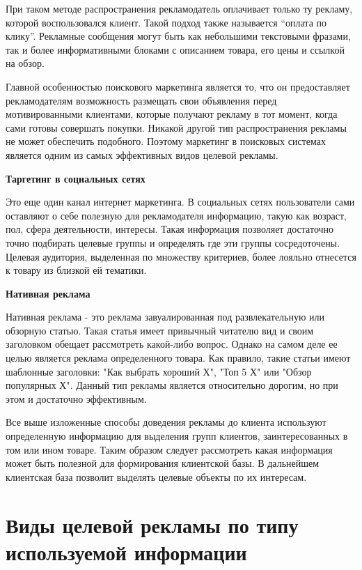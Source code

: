 При таком методе распространения рекламодатель оплачивает только ту рекламу, которой воспользовался клиент. Такой подход также называется “оплата по клику”. Рекламные сообщения могут быть как небольшими текстовыми фразами, так и более информативными блоками с описанием товара, его цены и ссылкой на обзор.

Главной особенностью поискового маркетинга является то, что он предоставляет рекламодателям возможность размещать свои объявления перед мотивированными клиентами, которые получают рекламу в тот момент, когда сами готовы совершать покупки. Никакой другой тип распространения рекламы не может обеспечить подобного. Поэтому маркетинг в поисковых системах является одним из самых эффективных видов целевой рекламы.

\textbf{Таргетинг в социальных сетях}

Это еще один канал интернет маркетинга. В социальных сетях пользователи сами оставляют о себе полезную для рекламодателя информацию, такую как возраст, пол, сфера деятельности, интересы. Такая информация позволяет достаточно точно подбирать целевые группы и определять где эти группы сосредоточены. Целевая аудитория, выделенная по множеству критериев, более лояльно отнесется к товару из близкой ей тематики.
    
\textbf{Нативная реклама}

Нативная реклама - это реклама завуалированная под развлекательную или обзорную статью. Такая статья имеет привычный читателю вид и своим заголовком обещает рассмотреть какой-либо вопрос. Однако на самом деле ее целью является реклама определенного товара. Как правило, такие статьи имеют шаблонные заголовки: "Как выбрать хороший Х", "Топ 5 Х" или "Обзор популярных Х". Данный тип рекламы является относительно дорогим, но при этом и достаточно эффективным.   

Все выше изложенные способы доведения рекламы до клиента используют определенную информацию для выделения групп клиентов, заинтересованных в том или ином товаре. Таким образом следует рассмотреть какая информация может быть полезной для формирования клиентской базы. В дальнейшем клиентская база позволит выделять целевые объекты по их интересам.
    
\section{Виды целевой рекламы по типу используемой информации} 
    
